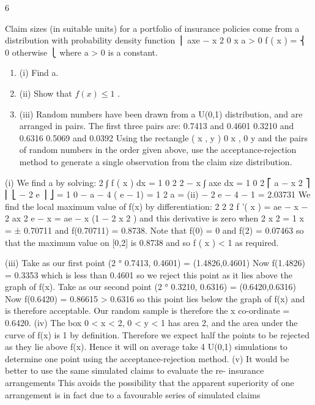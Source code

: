 6\documentclass[a4paper,12pt]{article}
\begin{document}
Claim sizes (in suitable units) for a portfolio of insurance policies come from a
distribution with probability density function
⎪ axe − x 2 0 \leq x  a > 0
f ( x ) = ⎨
0 otherwise
⎩
where a > 0 is a constant.
\begin{enumerate}
\item (i) Find a. 
\item (ii) Show that $f ( x ) \leq 1$ . 
\item (iii) Random numbers have been drawn from a U(0,1) distribution, and are
arranged in pairs. The first three pairs are:
0.7413 and 0.4601
0.3210 and 0.6316
0.5069 and 0.0392
Using the rectangle { ( x , y ) 0 \leq x , 0 \leq y  } and the pairs of random
numbers in the order given above, use the acceptance-rejection method to
generate a single observation from the claim size distribution.
\end{enumerate}

(i)
We find a by solving:
2
∫ f ( x ) dx = 1
0
2
2
− x
∫ axe dx = 1
0
2
⎡ a − x 2 ⎤
⎢ ⎣ − 2 e ⎥ ⎦ = 1
0
− a − 4
( e − 1) = 1
2
a =
(ii)
− 2
e
− 4
− 1
= 2.03731
We find the local maximum value of f(x) by differentiation:
2
2
2
f '( x ) = ae − x − 2 ax 2 e − x = ae − x (1 − 2 x 2 )
and this derivative is zero when
2 x 2 = 1
x = ± 0.70711
and f(0.70711) = 0.8738.
Note that f(0) = 0 and f(2) = 0.07463 so that the maximum value on [0,2] is
0.8738 and so f ( x ) < 1 as required.



(iii)
Take as our first point (2 ° 0.7413, 0.4601) = (1.4826,0.4601)
Now f(1.4826) = 0.3353 which is less than 0.4601 so we reject this point as it
lies above the graph of f(x).
Take as our second point (2 ° 0.3210, 0.6316) = (0.6420,0.6316)
Now f(0.6420) = 0.86615 > 0.6316 so this point lies below the graph of f(x)
and is therefore acceptable. Our random sample is therefore the x co-ordinate
= 0.6420.
(iv) The box 0 < x < 2, 0 < y < 1 has area 2, and the area under the curve of f(x) is
1 by definition. Therefore we expect half the points to be rejected as they lie
above f(x). Hence it will on average take 4 U(0,1) simulations to determine
one point using the acceptance-rejection method.
(v) It would be better to use the same simulated claims to evaluate the re-
insurance arrangements
This avoids the possibility that the apparent superiority of one arrangement is
in fact due to a favourable series of simulated claims
\end{document}
